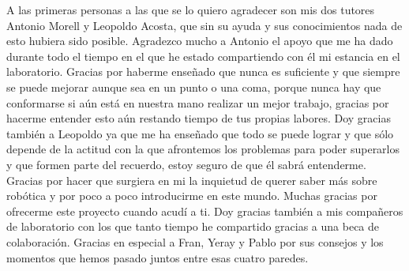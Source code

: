 \cleardoublepage
\thispagestyle{empty}

A las primeras personas a las que se lo quiero agradecer son mis dos tutores Antonio Morell y Leopoldo Acosta, que sin su ayuda y sus conocimientos nada de esto hubiera sido posible.
Agradezco mucho a Antonio el apoyo que me ha dado durante todo el tiempo en el que he estado compartiendo con él mi estancia en el laboratorio.
Gracias por haberme enseñado que nunca es suficiente y que siempre se puede mejorar aunque sea en un punto o una coma, porque nunca hay que conformarse si aún está en nuestra mano realizar un mejor trabajo, gracias por hacerme entender esto aún restando tiempo de tus propias labores.
Doy gracias también a Leopoldo ya que me ha enseñado que todo se puede lograr y que sólo depende de la actitud con la que afrontemos los problemas para poder superarlos y que formen parte del recuerdo, estoy seguro de que él sabrá entenderme.
Gracias por hacer que surgiera en mi la inquietud de querer saber más sobre robótica y por poco a poco introducirme en este mundo.
Muchas gracias por ofrecerme este proyecto cuando acudí a ti.
Doy gracias también a mis compañeros de laboratorio con los que tanto tiempo he compartido gracias a una beca de colaboración.
Gracias en especial a Fran, Yeray y Pablo por sus consejos y los momentos que hemos pasado juntos entre esas cuatro paredes.

